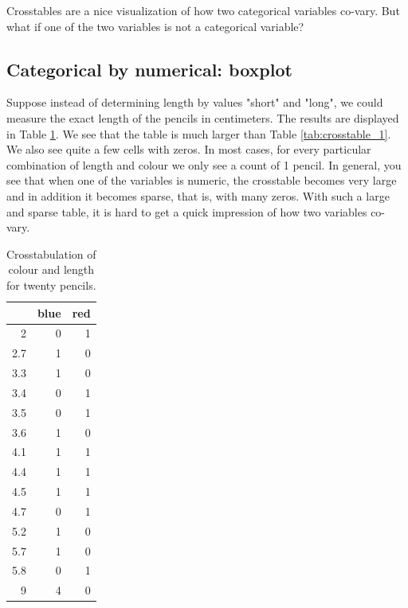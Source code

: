 \documentclass[]{book}\usepackage[]{graphicx}\usepackage[]{color}
\begin{document}
Crosstables are a nice visualization of how two categorical variables co-vary. But what if one of the two variables is not a categorical variable?


\subsection{Categorical by numerical: boxplot}
Suppose instead of determining length by values "short" and "long", we could measure the exact length of the pencils in centimeters. The results are displayed in Table \ref{tab:crosstable_2}. We see that the table is much larger than Table \ref{tab:crosstable_1}. We also see quite a few cells with zeros. In most cases, for every particular combination of length and colour we only see a count of 1 pencil. In general, you see that when one of the variables is numeric, the crosstable becomes very large and in addition it becomes sparse, that is, with many zeros. With such a large and sparse table, it is hard to get a quick impression of how two variables co-vary.

\begin{table}[ht]
\centering
\caption{Crosstabulation of colour and length for twenty pencils.} 
\label{tab:crosstable_2}
\begin{tabular}{rrr}
  \hline
 & blue & red \\ 
  \hline
2 &   0 &   1 \\ 
  2.7 &   1 &   0 \\ 
  3.3 &   1 &   0 \\ 
  3.4 &   0 &   1 \\ 
  3.5 &   0 &   1 \\ 
  3.6 &   1 &   0 \\ 
  4.1 &   1 &   1 \\ 
  4.4 &   1 &   1 \\ 
  4.5 &   1 &   1 \\ 
  4.7 &   0 &   1 \\ 
  5.2 &   1 &   0 \\ 
  5.7 &   1 &   0 \\ 
  5.8 &   0 &   1 \\ 
  9 &   4 &   0 \\ 
   \hline
\end{tabular}
\end{table}
\end{document}

